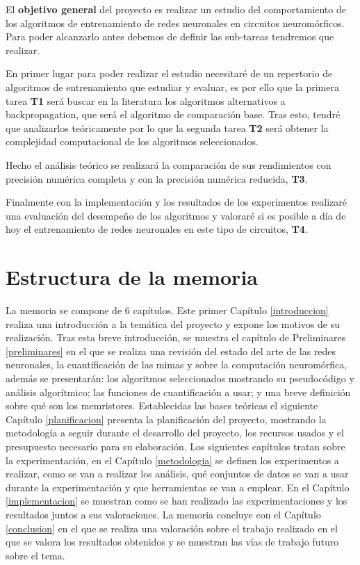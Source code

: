 El \textbf{objetivo general} del proyecto es realizar un estudio del comportamiento de los algoritmos de entrenamiento de redes neuronales en circuitos neuromórficos. Para poder alcanzarlo antes debemos de definir las sub-tareas tendremos que realizar.  

En primer lugar para poder realizar el estudio necesitaré de un repertorio de algoritmos de entrenamiento que estudiar y evaluar, es por ello que la primera tarea \textbf{T1} será buscar en la literatura los algoritmos alternativos a backpropagation, que será el algoritmo de comparación base. Tras esto, tendré que analizarlos teóricamente por lo que la segunda tarea \textbf{T2} será obtener la complejidad computacional de los algoritmos seleccionados. 

Hecho el análisis teórico se realizará la comparación de sus rendimientos con precisión numérica completa y con la precisión numérica reducida, \textbf{T3}. 

Finalmente con la implementación y los resultados de los experimentos realizaré una evaluación del desempeño de los algoritmos y valoraré si es posible a día de hoy el entrenamiento de redes neuronales en este tipo de circuitos, \textbf{T4}.

\section{Estructura de la memoria}

La memoria se compone de 6 capítulos. Este primer Capítulo \ref{introduccion} realiza una introducción a la temática del proyecto y expone los motivos de su realización. Tras esta breve introducción, se muestra el capítulo de Preliminares \ref{preliminares} en el que se realiza una revisión del estado del arte de las redes neuronales, la cuantificación de las mimas y sobre la computación neuromórfica, además se presentarán: los algoritmos seleccionados mostrando su pseudocódigo y análisis algorítmico; las funciones de cuantificación a usar; y una breve definición sobre qué son los memristores. Establecidas las bases teóricas el siguiente Capítulo \ref{planificacion} presenta la planificación del proyecto, mostrando la metodología a seguir durante el desarrollo del proyecto, los recursos usados y el presupuesto necesario para su elaboración. Los siguientes capítulos tratan sobre la experimentación, en el Capítulo \ref{metodologia} se definen los experimentos a realizar, como se van a realizar los análisis, qué conjuntos de datos se van a usar durante la experimentación y que herramientas se van a emplear. En el Capítulo \ref{implementacion} se muestran como se han realizado las experimentaciones y los resultados juntos a sus valoraciones. La memoria concluye con el Capítulo \ref{conclusion} en el que se realiza una valoración sobre el trabajo realizado en el que se valora los resultados obtenidos y se muestran las vías de trabajo futuro sobre el tema.

